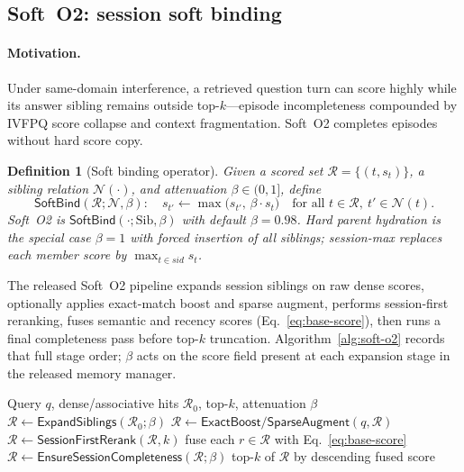 \documentclass[preprint,12pt,authoryear]{elsarticle}
\newtheorem{definition}{Definition}
\begin{document}
\subsection{Soft~O2: session soft binding}\label{sec:soft-o2}
\paragraph{Motivation.}
Under same-domain interference, a retrieved question turn can score highly while its answer sibling remains outside top-$k$---episode incompleteness compounded by IVFPQ score collapse and context fragmentation.
Soft~O2 completes episodes without hard score copy.

\begin{definition}[Soft binding operator]\label{def:softbind}
Given a scored set $\mathcal{R}=\{(t,s_t)\}$, a sibling relation $\mathcal{N}(\cdot)$, and attenuation $\beta\in(0,1]$, define
\begin{equation}\label{eq:soft-o2}
\mathsf{SoftBind}(\mathcal{R};\mathcal{N},\beta):\quad
s_{t'}\leftarrow\max\bigl(s_{t'},\,\beta\cdot s_t\bigr)
\quad\text{for all }t\in\mathcal{R},\ t'\in\mathcal{N}(t).
\end{equation}
Soft~O2 is $\mathsf{SoftBind}(\cdot;\mathrm{Sib},\beta)$ with default $\beta{=}0.98$.
Hard parent hydration is the special case $\beta{=}1$ with forced insertion of all siblings; session-max replaces each member score by $\max_{t\in sid}s_t$.
\end{definition}

The released Soft~O2 pipeline expands session siblings on raw dense scores, optionally applies exact-match boost and sparse augment, performs session-first reranking, fuses semantic and recency scores (Eq.~\eqref{eq:base-score}), then runs a final completeness pass before top-$k$ truncation.
Algorithm~\ref{alg:soft-o2} records that full stage order; $\beta$ acts on the score field present at each expansion stage in the released memory manager.

\begin{algorithm}[t]
\caption{Soft~O2 session soft binding (implementation order)}
\label{alg:soft-o2}
\begin{algorithmic}[1]
\Require Query $q$, dense/associative hits $\mathcal{R}_0$, top-$k$, attenuation $\beta$
\State $\mathcal{R}\leftarrow\mathsf{ExpandSiblings}(\mathcal{R}_0;\beta)$ 
\State $\mathcal{R}\leftarrow\mathsf{ExactBoost}/\mathsf{SparseAugment}(q,\mathcal{R})$ 
\State $\mathcal{R}\leftarrow\mathsf{SessionFirstRerank}(\mathcal{R},k)$
\State fuse each $r\in\mathcal{R}$ with Eq.~\eqref{eq:base-score}
\State $\mathcal{R}\leftarrow\mathsf{EnsureSessionCompleteness}(\mathcal{R};\beta)$ 
\State \Return top-$k$ of $\mathcal{R}$ by descending fused score
\end{algorithmic}
\end{algorithm}
\end{document}
